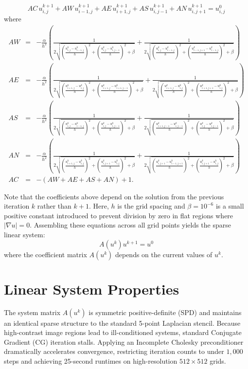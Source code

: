 \documentclass[11pt,letterpaper]{article}
\begin{document}
\begin{equation*}
AC \, u_{i,j}^{k+1} + AW \, u_{i-1,j}^{k+1} + AE \, u_{i+1,j}^{k+1} + AS \, u_{i,j-1}^{k+1} + AN \, u_{i,j+1}^{k+1} = u_{i,j}^0
\end{equation*}
where
\begin{eqnarray*}
AW &=& - \frac{\alpha}{h^2} \left (
       \frac{1}{2 \sqrt{ \left ( \frac{u_{i,j}^k-u_{i-1,j}^k}{h} \right )^2
       + \left ( \frac{u_{i,j}^k-u_{i,j-1}^k}{h} \right )^2 + \beta}} +
       \frac{1}{2\sqrt{ \left ( \frac{u_{i,j}^k-u_{i-1,j}^k}{h} \right )^2
       + \left ( \frac{u_{i-1,j+1}^k-u_{i-1,j}^k}{h} \right )^2 + \beta}} \right ) \\
AE &=& - \frac{\alpha}{h^2} \left(
       \frac{1}{2 \sqrt{ \left ( \frac{u_{i+1,j}^k-u_{i,j}^k}{h} \right )^2
       + \left ( \frac{u_{i+1,j}^k-u_{i+1,j-1}^k}{h} \right )^2 + \beta}} +
       \frac{1}{2 \sqrt{ \left ( \frac{u_{i+1,j}^k-u_{i,j}^k}{h} \right )^2
       + \left ( \frac{u_{i+1,j+1}^k-u_{i,j}^k}{h} \right )^2 + \beta}} \right ) \\
AS &=& - \frac{\alpha}{h^2} \left(
       \frac{1}{2 \sqrt{ \left ( \frac{u_{i,j}^k-u_{i-1,j}^k}{h} \right )^2
       + \left ( \frac{u_{i,j}^k-u_{i,j-1}^k}{h} \right )^2 + \beta}} +
       \frac{1}{2 \sqrt{ \left ( \frac{u_{i+1,j-1}^k-u_{i,j-1}^k}{h} \right )^2
       + \left ( \frac{u_{i,j}^k-u_{i,j-1}^k}{h} \right )^2 + \beta}} \right ) \\
AN &=& -\frac{\alpha}{h^2} \left(
       \frac{1}{2 \sqrt{ \left ( \frac{u_{i+1,j}^k-u_{i,j}^k}{h} \right )^2
       + \left ( \frac{u_{i,j+1}^k-u_{i,j}^k}{h} \right )^2 + \beta}} +
       \frac{1}{2 \sqrt{ \left ( \frac{u_{i,j+1}^k-u_{i-1,j+1}^k}{h} \right )^2
       + \left ( \frac{u_{i,j+1}^k-u_{i,j}^k}{h} \right )^2 + \beta}} \right) \\
AC &=& -(AW + AE + AS + AN) + 1.
\end{eqnarray*}

\noindent Note that the coefficients above depend on the solution from the previous iteration $k$ rather than $k+1$. Here, $h$ is the grid spacing and $\beta = 10^{-6}$ is a small positive constant introduced to prevent division by zero in flat regions where $|\nabla u| = 0$. Assembling these equations across all grid points yields the sparse linear system:
\begin{equation*}
A(u^{k}) u^{k+1} = u^{0}
\end{equation*}
where the coefficient matrix $A(u^{k})$ depends on the current values of $u^{k}$.

\section{Linear System Properties}

The system matrix $A(u^k)$ is symmetric positive-definite (SPD) and maintains an identical sparse structure to the standard 5-point Laplacian stencil. Because high-contrast image regions lead to ill-conditioned systems, standard Conjugate Gradient (CG) iteration stalls. Applying an Incomplete Cholesky preconditioner dramatically accelerates convergence, restricting iteration counts to under $1,000$ steps and achieving 25-second runtimes on high-resolution $512 \times 512$ grids.
\end{document}
